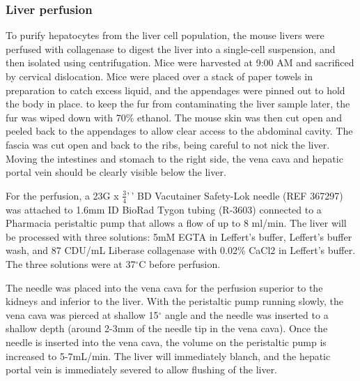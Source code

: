 \documentclass[10pt,letterpaper]{article}
\begin{document}
\hypertarget{liver-perfusion}{%
\subsubsection{Liver perfusion}\label{liver-perfusion}}

To purify hepatocytes from the liver cell population, the mouse livers
were perfused with collagenase to digest the liver into a single-cell
suspension, and then isolated using centrifugation. Mice were harvested
at 9:00 AM and sacrificed by cervical dislocation. Mice were placed over
a stack of paper towels in preparation to catch excess liquid, and the
appendages were pinned out to hold the body in place. to keep the fur
from contaminating the liver sample later, the fur was wiped down with
70\% ethanol. The mouse skin was then cut open and peeled back to the
appendages to allow clear access to the abdominal cavity. The fascia was
cut open and back to the ribs, being careful to not nick the liver.
Moving the intestines and stomach to the right side, the vena cava and
hepatic portal vein should be clearly visible below the liver.

For the perfusion, a 23G x \(\frac{3}{4}\)'\,' BD Vacutainer Safety-Lok
needle (REF 367297) was attached to 1.6mm ID BioRad Tygon tubing
(R-3603) connected to a Pharmacia peristaltic pump that allows a flow of
up to 8 ml/min. The liver will be processed with three solutions: 5mM
EGTA in Leffert's buffer, Leffert's buffer wash, and 87 CDU/mL Liberase
collagenase with 0.02\% CaCl2 in Leffert's buffer. The three solutions
were at 37\(^{\circ}\)C before perfusion.

The needle was placed into the vena cava for the perfusion superior to
the kidneys and inferior to the liver. With the peristaltic pump running
slowly, the vena cava was pierced at shallow 15\(^{\circ}\) angle and
the needle was inserted to a shallow depth (around 2-3mm of the needle
tip in the vena cava). Once the needle is inserted into the vena cava,
the volume on the peristaltic pump is increased to 5-7mL/min. The liver
will immediately blanch, and the hepatic portal vein is immediately
severed to allow flushing of the liver.
\end{document}
